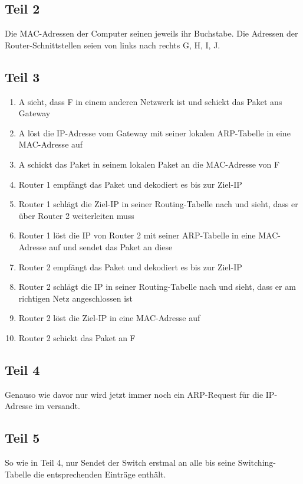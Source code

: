 \documentclass[10pt,a4paper]{article}
\begin{document}
\subsection{Teil 2}

Die MAC-Adressen der Computer seinen jeweils ihr Buchstabe. Die Adressen der
Router-Schnittstellen seien von links nach rechts G, H, I, J.

\subsection{Teil 3}

\begin{enumerate}
\item A sieht, dass F in einem anderen Netzwerk ist und schickt das Paket ans
  Gateway
\item A löst die IP-Adresse vom Gateway mit seiner lokalen ARP-Tabelle in eine
  MAC-Adresse auf
\item A schickt das Paket in seinem lokalen Paket an die MAC-Adresse von F
\item Router 1 empfängt das Paket und dekodiert es bis zur Ziel-IP
\item Router 1 schlägt die Ziel-IP in seiner Routing-Tabelle nach und sieht,
  dass er über Router 2 weiterleiten muss
\item Router 1 löst die IP von Router 2 mit seiner ARP-Tabelle in eine
  MAC-Adresse auf und sendet das Paket an diese
\item Router 2 empfängt das Paket und dekodiert es bis zur Ziel-IP
\item Router 2 schlägt die IP in seiner Routing-Tabelle nach und sieht, dass er
  am richtigen Netz angeschlossen ist
\item Router 2 löst die Ziel-IP in eine MAC-Adresse auf
\item Router 2 schickt das Paket an F
\end{enumerate}

\subsection{Teil 4}

Genauso wie davor nur wird jetzt immer noch ein ARP-Request für die IP-Adresse
im versandt.

\subsection{Teil 5}

So wie in Teil 4, nur Sendet der Switch erstmal an alle bis seine
Switching-Tabelle die entsprechenden Einträge enthält.
\end{document}
